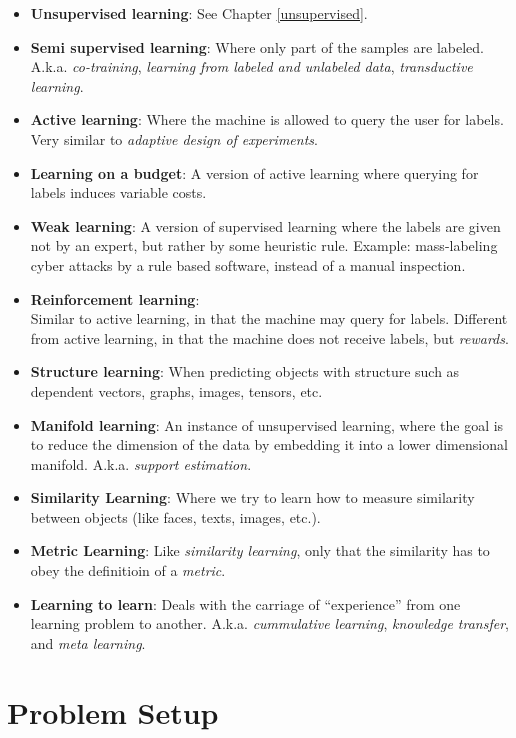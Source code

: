 \documentclass[]{book}
\theoremstyle{definition}
\theoremstyle{definition}
\theoremstyle{definition}
\theoremstyle{remark}
\begin{document}
\begin{itemize}
\item
  \textbf{Unsupervised learning}: See Chapter \ref{unsupervised}.
\item
  \textbf{Semi supervised learning}: Where only part of the samples are
  labeled. A.k.a. \emph{co-training}, \emph{learning from labeled and
  unlabeled data}, \emph{transductive learning}.
\item
  \textbf{Active learning}: Where the machine is allowed to query the
  user for labels. Very similar to \emph{adaptive design of
  experiments}.
\item
  \textbf{Learning on a budget}: A version of active learning where
  querying for labels induces variable costs.
\item
  \textbf{Weak learning}: A version of supervised learning where the
  labels are given not by an expert, but rather by some heuristic rule.
  Example: mass-labeling cyber attacks by a rule based software, instead
  of a manual inspection.
\item
  \textbf{Reinforcement learning}:\\
  Similar to active learning, in that the machine may query for labels.
  Different from active learning, in that the machine does not receive
  labels, but \emph{rewards}.
\item
  \textbf{Structure learning}: When predicting objects with structure
  such as dependent vectors, graphs, images, tensors, etc.
\item
  \textbf{Manifold learning}: An instance of unsupervised learning,
  where the goal is to reduce the dimension of the data by embedding it
  into a lower dimensional manifold. A.k.a. \emph{support estimation}.
\item
  \textbf{Similarity Learning}: Where we try to learn how to measure
  similarity between objects (like faces, texts, images, etc.).
\item
  \textbf{Metric Learning}: Like \emph{similarity learning}, only that
  the similarity has to obey the definitioin of a \emph{metric}.
\item
  \textbf{Learning to learn}: Deals with the carriage of ``experience''
  from one learning problem to another. A.k.a. \emph{cummulative
  learning}, \emph{knowledge transfer}, and \emph{meta learning}.
\end{itemize}

\section{Problem Setup}\label{problem-setup-3}
\end{document}
